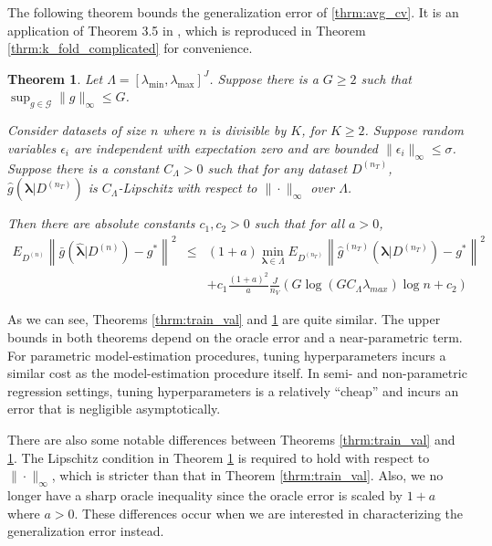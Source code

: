 \documentclass[12pt]{article}
\newtheorem{theorem}{Theorem}
\begin{document}
The following theorem bounds the generalization error of \eqref{thrm:avg_cv}. It is an application of Theorem 3.5 in \citet{lecue2012oracle}, which is reproduced in Theorem \ref{thrm:k_fold_complicated} for convenience.

\begin{theorem}
\label{thrm:kfold}
Let $\Lambda = [\lambda_{\min}, \lambda_{\max}]^J$. Suppose there is a $G \ge  2$ such that $\sup_{g \in \mathcal{G}} \|g\|_\infty \le G$.

Consider datasets of size $n$ where $n$ is divisible by $K$, for $K \ge 2$.
Suppose random variables $\epsilon_i$ are independent with expectation zero and are bounded $\| \epsilon_i \|_\infty \le \sigma$. Suppose there is a constant $C_\Lambda >0$ such that for any dataset $D^{(n_T)}$, $\hat g (\boldsymbol{\lambda} | D^{(n_T)})$ is $C_\Lambda$-Lipschitz with respect to $\| \cdot \|_\infty$ over $\Lambda$.

Then there are absolute constants $c_1, c_2 > 0$ such that for all $a > 0$,
\begin{eqnarray}
E_{D^{(n)}} \left \| \bar{g} ( \hat{\boldsymbol \lambda} | {D^{(n)}} ) - g^* \right \|^2 &\le&
(1+a) \min_{\boldsymbol{\lambda} \in \Lambda}  E_{D^{(n_T)}} \left \| \hat{g}^{(n_T)}(\boldsymbol \lambda | D^{(n_T)}) - g^* \right \|^2 \\
&& + c_1 \frac{(1+a)^2}{a} \frac{J}{n_V} 
\left (
G \log (GC_\Lambda \lambda_{max} ) \log n + c_2
\right )
\end{eqnarray}
\end{theorem}

As we can see, Theorems \ref{thrm:train_val} and \ref{thrm:kfold} are quite similar. The upper bounds in both theorems depend on the oracle error and a near-parametric term. For parametric model-estimation procedures, tuning hyperparameters incurs a similar cost as the model-estimation procedure itself. In semi- and non-parametric regression settings, tuning hyperparameters is a relatively ``cheap'' and incurs an error that is negligible asymptotically.

There are also some notable differences between Theorems \ref{thrm:train_val} and \ref{thrm:kfold}. The Lipschitz condition in Theorem \ref{thrm:kfold} is required to hold with respect to $\| \cdot \|_\infty$, which is stricter than that in Theorem \ref{thrm:train_val}. Also, we no longer have a sharp oracle inequality since the oracle error is scaled by $1+a$ where $a > 0$. These differences occur when we are interested in characterizing the generalization error instead.
\end{document}
